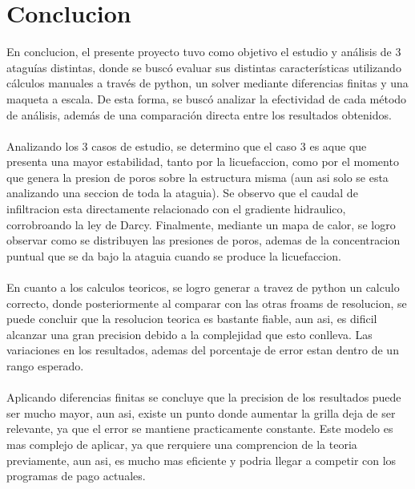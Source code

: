 \part{Conclucion}


En conclucion, el presente proyecto tuvo como objetivo el estudio y análisis de 3 ataguías distintas, donde se buscó evaluar sus distintas características utilizando cálculos manuales a través de python, un solver mediante diferencias finitas y una maqueta a escala. 
De esta forma, se buscó analizar la efectividad de cada método de análisis, además de una comparación directa entre los resultados obtenidos. 
\\ \\
Analizando los 3 casos de estudio, se determino que el caso 3 es aque que presenta una mayor estabilidad, tanto por la licuefaccion, como por el momento que genera la presion de poros sobre la estructura misma (aun asi solo se esta analizando una seccion de toda la ataguia).
Se observo que el caudal de infiltracion esta directamente relacionado con el gradiente hidraulico, corrobroando la ley de Darcy. Finalmente, mediante un mapa de calor, se logro observar como se distribuyen las presiones de poros, ademas de la concentracion puntual que se da bajo
la ataguia cuando se produce la licuefaccion.
\\ \\
En cuanto a los calculos teoricos, se logro generar a travez de python un calculo correcto, donde posteriormente al comparar con las otras froams de resolucion, se puede concluir que la resolucion teorica es bastante fiable, aun asi, es dificil alcanzar una gran precision debido a la complejidad que esto conlleva. 
Las variaciones en los resultados, ademas del porcentaje de error estan dentro de un rango esperado.
\\ \\
Aplicando diferencias finitas se concluye que la precision de los resultados puede ser mucho mayor, aun asi, existe un punto donde aumentar la grilla deja de ser relevante, ya que el error se mantiene practicamente constante. Este modelo es mas complejo de aplicar, ya que rerquiere una comprencion de la teoria previamente, aun asi, es mucho mas eficiente y podria llegar a competir con los programas de pago actuales.
